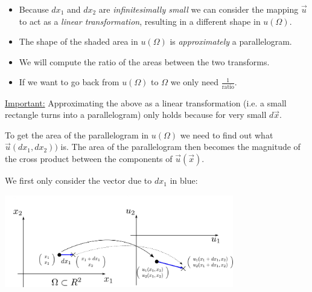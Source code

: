 \begin{frame}




\begin{itemize}
\item Because $dx_1$ and $dx_2$ are \emph{infinitesimally small} we can consider the mapping 
$\vec u$ to act as a \emph{linear transformation}, resulting in a different shape in $u(\Omega)$. 
\item The shape of the shaded area in $u(\Omega)$ is \emph{approximately} a parallelogram.
\item We will compute the ratio of the areas between the two transforms.
\item If we want to go back from $u(\Omega)$ to $\Omega$ we only need $\frac{1}{\text{ratio}}$.
\end{itemize}

\end{frame} 


\underline{Important:}
Approximating the above as a linear transformation (i.e. a small rectangle turns into a parallelogram) only holds because for very small $d\vec x$.

To get the area of the parallelogram in $u(\Omega)$ we need to find out what $\vec u(dx_1, dx_2))$ is.
The area of the parallelogram then becomes the magnitude of the cross product between the components of $\vec u(\vec x)$.

\newpage

We first only consider the vector due to $dx_1$ in blue:

\includegraphics[width=0.75\textwidth]{img/x1.pdf}

